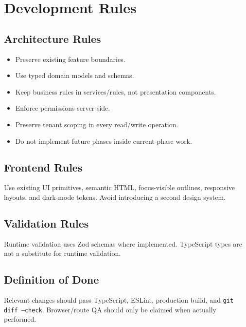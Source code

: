 \chapter{Development Rules}
\section{Architecture Rules}
\begin{itemize}
\item Preserve existing feature boundaries.
\item Use typed domain models and schemas.
\item Keep business rules in services/rules, not presentation components.
\item Enforce permissions server-side.
\item Preserve tenant scoping in every read/write operation.
\item Do not implement future phases inside current-phase work.
\end{itemize}

\section{Frontend Rules}
Use existing UI primitives, semantic HTML, focus-visible outlines, responsive layouts, and dark-mode tokens. Avoid introducing a second design system.

\section{Validation Rules}
Runtime validation uses Zod schemas where implemented. TypeScript types are not a substitute for runtime validation.

\section{Definition of Done}
Relevant changes should pass TypeScript, ESLint, production build, and \texttt{git diff --check}. Browser/route QA should only be claimed when actually performed.
